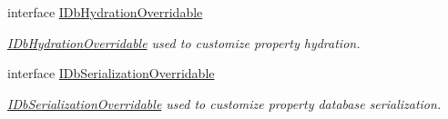 \begin{DoxyCompactItemize}
interface \mbox{\hyperlink{interface_blue_cloud_1_1_extensions_1_1_data_1_1_i_db_hydration_overridable}{I\+Db\+Hydration\+Overridable}}
\begin{DoxyCompactList}\small\item\em \mbox{\hyperlink{interface_blue_cloud_1_1_extensions_1_1_data_1_1_i_db_hydration_overridable}{I\+Db\+Hydration\+Overridable}} used to customize property hydration. \end{DoxyCompactList}\item 
interface \mbox{\hyperlink{interface_blue_cloud_1_1_extensions_1_1_data_1_1_i_db_serialization_overridable}{I\+Db\+Serialization\+Overridable}}
\begin{DoxyCompactList}\small\item\em \mbox{\hyperlink{interface_blue_cloud_1_1_extensions_1_1_data_1_1_i_db_serialization_overridable}{I\+Db\+Serialization\+Overridable}} used to customize property database serialization. \end{DoxyCompactList}\end{DoxyCompactItemize}
